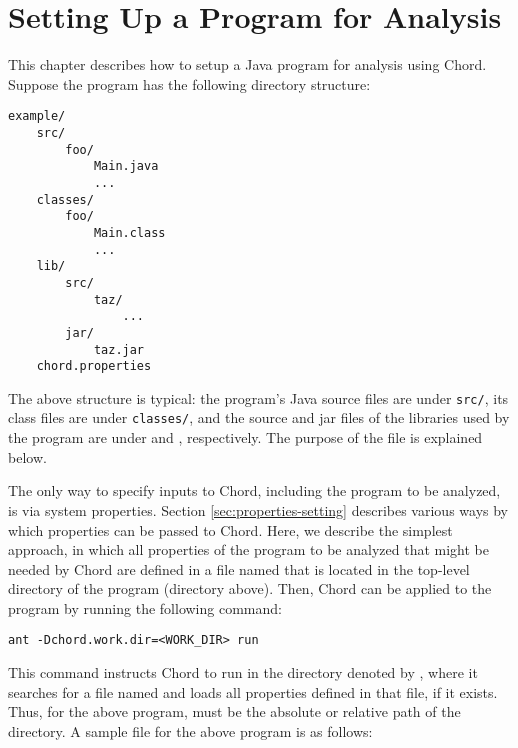 \chapter{Setting Up a Program for Analysis}
\label{chap:setup}

This chapter describes how to setup a Java program for analysis using Chord.
Suppose the program has the following directory structure:

\begin{framed}
\begin{verbatim}
example/
    src/
        foo/
            Main.java
            ...
    classes/
        foo/
            Main.class
            ...
    lib/
        src/
            taz/
                ...
        jar/
            taz.jar
    chord.properties
\end{verbatim}
\end{framed}

The above structure is typical: the program's Java source
files are under {\tt src/}, its class files are under {\tt classes/},
and the source and jar files of the libraries used by the program are
under  and , respectively.  The
purpose of the  file is explained below.

The only way to specify inputs to Chord, including the program
to be analyzed, is via system properties.
Section \ref{sec:properties-setting} describes various ways by which
properties can be passed to Chord.  Here, we describe the
simplest approach, in which all properties of the program to be analyzed
that might be needed by Chord are defined in a file named  
that is located in the top-level directory of the program (directory  above).
Then, Chord can be applied to the program by running the following command:

\begin{framed}
\begin{verbatim}
ant -Dchord.work.dir=<WORK_DIR> run
\end{verbatim}
\end{framed}

This command instructs Chord to run in the directory denoted by , where it searches for a file
named  and
loads all properties defined in that file, if it exists.
Thus, for the above program,  must be the absolute or relative path of the
 directory.  A sample  file for the above program is as follows:

